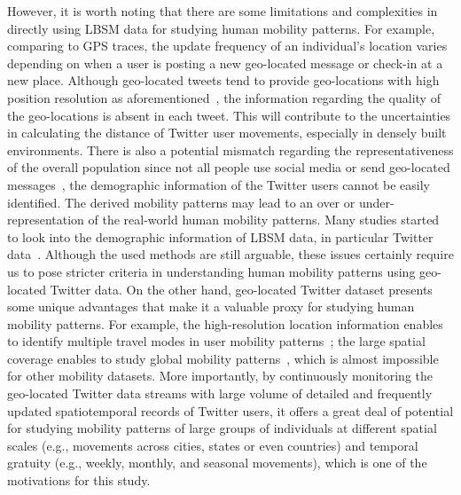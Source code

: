 \documentclass[ijgi,article,submit,moreauthors,pdftex,10pt,a4paper]{mdpi}
\theoremstyle{mdpi}
\newcounter{ex}
\newcounter{re}
\theoremstyle{mdpidefinition}
\begin{document}
However, it is worth noting that there are some limitations and complexities in directly using LBSM data for studying human mobility patterns.
For example, comparing to GPS traces, the update frequency of an individual's location varies depending on when a user is posting a new geo-located message or check-in at a new place.
Although geo-located tweets tend to provide geo-locations with high position resolution as aforementioned~\cite{Jurdak2015}, the information regarding the quality of the geo-locations is absent in each tweet.
This will contribute to the uncertainties in calculating the distance of Twitter user movements, especially in densely built environments.   
There is also a potential mismatch regarding the representativeness of the overall population since not all people use social media or send geo-located messages~\cite{kung2014exploring}, the demographic information of the Twitter users cannot be easily identified.
The derived mobility patterns may lead to an over or under-representation of the real-world human mobility patterns.
Many studies started to look into the demographic information of LBSM data, in particular Twitter data~\cite{mitchell2013geography,longley2015geotemporal}.
Although the used methods are still arguable, these issues certainly require us to pose stricter criteria in understanding human mobility patterns using geo-located Twitter data.
On the other hand, geo-located Twitter dataset presents some unique advantages that make it a valuable proxy for studying human mobility patterns.
For example, the high-resolution location information enables to identify multiple travel modes in user mobility patterns~\cite{Jurdak2015}; the large spatial coverage enables to study global mobility patterns~\cite{hawelka2014geo}, which is almost impossible for other mobility datasets.
More importantly, by continuously monitoring the geo-located Twitter data streams with large volume of detailed and frequently updated spatiotemporal records of Twitter users, it offers a great deal of potential for studying mobility patterns of large groups of individuals at different spatial scales (e.g., movements across cities, states or even countries) and temporal gratuity (e.g., weekly, monthly, and seasonal movements), which is one of the motivations for this study.
\end{document}
